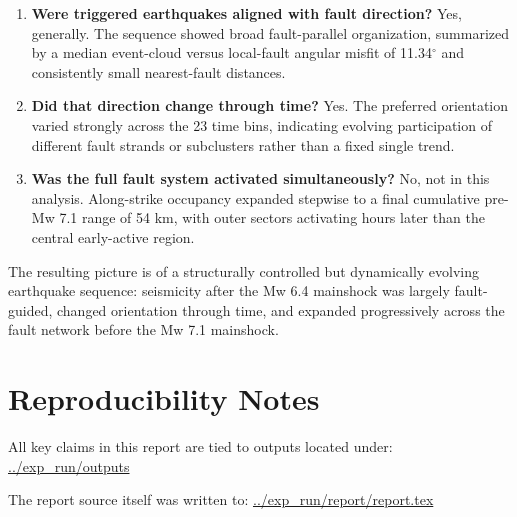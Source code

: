 \documentclass[11pt]{article}
\begin{document}
\begin{enumerate}[label=\arabic*.]
    \item \textbf{Were triggered earthquakes aligned with fault direction?} Yes, generally. The sequence showed broad fault-parallel organization, summarized by a median event-cloud versus local-fault angular misfit of 11.34$^{\circ}$ and consistently small nearest-fault distances.
    \item \textbf{Did that direction change through time?} Yes. The preferred orientation varied strongly across the 23 time bins, indicating evolving participation of different fault strands or subclusters rather than a fixed single trend.
    \item \textbf{Was the full fault system activated simultaneously?} No, not in this analysis. Along-strike occupancy expanded stepwise to a final cumulative pre-Mw 7.1 range of 54 km, with outer sectors activating hours later than the central early-active region.
\end{enumerate}

The resulting picture is of a structurally controlled but dynamically evolving earthquake sequence: seismicity after the Mw 6.4 mainshock was largely fault-guided, changed orientation through time, and expanded progressively across the fault network before the Mw 7.1 mainshock.

\section*{Reproducibility Notes}
All key claims in this report are tied to outputs located under:
\url{../exp_run/outputs}

The report source itself was written to:
\url{../exp_run/report/report.tex}
\end{document}
